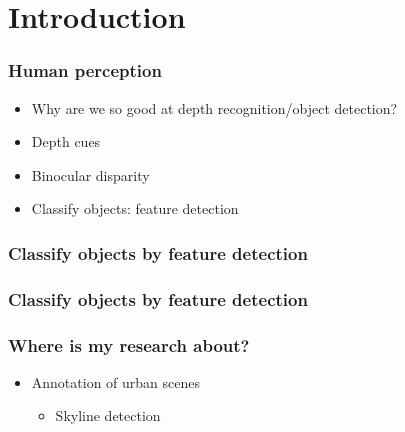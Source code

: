 \documentclass{beamer}
\begin{document}
\frame{\tableofcontents}

\section{Introduction}
\frame
{
	\frametitle{Human perception}
	\begin{itemize}
	\item <+-| alert@+> Why are we so good at depth recognition/object detection?
	\item <+-| alert@+> Depth cues
	\item <+-| alert@+> Binocular disparity


	\item <+-| alert@+> Classify objects: feature detection
	\end{itemize}
}

\frame
{
	\frametitle{Classify objects by feature detection}
}

\frame
{
	\frametitle{Classify objects by feature detection}
}

\frame
{
}

\frame
{
	\frametitle{Where is my research about?}
	\begin{itemize}
	\item <+-| alert@+> Annotation of urban scenes
		\begin{itemize}
			\item <+-| alert@+> Skyline detection
		\end{itemize}
	\end{itemize}
}
\end{document}
